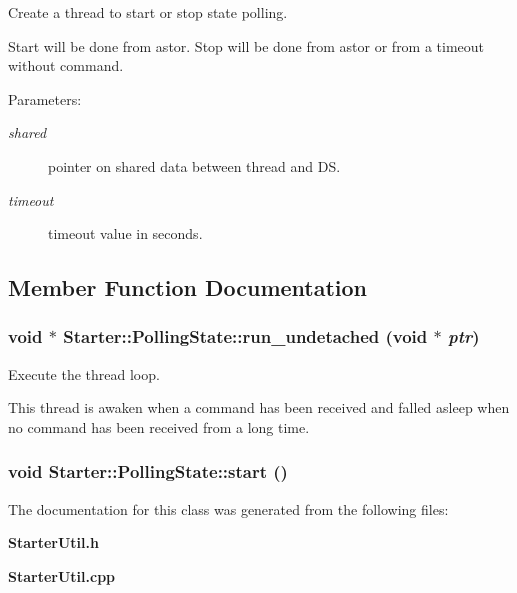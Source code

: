 Create a thread to start or stop state polling.

Start will be done from astor. Stop will be done from astor or from a timeout without command.\begin{Desc}
\item[Parameters: ]\par
\begin{description}
\item[{\em 
shared}]pointer on shared data between thread and DS. \item[{\em 
timeout}]timeout value in seconds. \end{description}
\end{Desc}


\subsection{Member Function Documentation}
\subsubsection{\setlength{\rightskip}{0pt plus 5cm}void $\ast$ Starter::Polling\-State::run\_\-undetached (void $\ast$ {\em ptr})}\label{classStarter_1_1PollingState_a1}


Execute the thread loop.

This thread is awaken when a command has been received  and falled asleep when no command has been received from a long time. 
\subsubsection{\setlength{\rightskip}{0pt plus 5cm}void Starter::Polling\-State::start ()\hspace{0.3cm}{\tt  [inline]}}\label{classStarter_1_1PollingState_a2}




The documentation for this class was generated from the following files:\begin{CompactItemize}
\item 
{\bf Starter\-Util.h}\item 
{\bf Starter\-Util.cpp}\end{CompactItemize}
